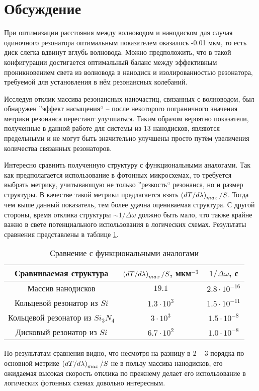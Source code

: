 \section{Обсуждение}

При оптимизации расстояния между волноводом и нанодиском для случая одиночного резонатора оптимальным показателем оказалось -0.01 мкм, то есть диск слегка вдвинут вглубь волновода. Можно предположить, что в такой конфигурации достигается оптимальный баланс между эффективным проникновением света из волновода в нанодиск и изолированностью резонатора, требуемой для установления в нём резонансных колебаний.

Исследуя отклик массива резонансных наночастиц, связанных с волноводом, был обнаружен ''эффект насыщения`` -- после некоторого пограничного значения метрики резонанса перестают улучшаться. Таким образом вероятно показатели, полученные в данной работе для системы из 13 нанодисков, являются предельными и не могут быть значительно улучшены просто путём увеличения количества связанных резонаторов.

Интересно сравнить полученную структуру с функциональными аналогами. Так как предполагается использование в фотонных микросхемах, то требуется выбрать метрику, учитывающую не только ''резкость`` резонанса, но и размер структуры. В качестве такой метрики предлагается взять $\left( dT/d\lambda \right)_{max}/S$. Тогда чем выше данный показатель, тем более удачна оцениваемая структура. С другой стороны, время отклика структуры $\sim 1/\Delta \omega$ должно быть мало, что также крайне важно в свете потенциального использования в логических схемах. Результаты сравнения представлены в таблице \ref{tbl:functional_compare}.

\begin{table}[H]
	\centering
	\begin{tabular}{|c|c|c|}
		\hline
		Сравниваемая структура & $\left( dT/d\lambda \right)_{max}/S$, мкм$^{-3}$ & $1/\Delta \omega$, с \\
		\hline
		Массив нанодисков & $19.1$ & $2.8 \cdot 10^{-16}$\\
		\hline
		Кольцевой резонатор из $Si$ \cite{Vilson2004} & $1.3 \cdot 10^3$ & $1.5 \cdot 10^{-11}$\\
		\hline
		Кольцевой резонатор из $Si_3 N_4$ \cite{Gondarenko2009} & $3 \cdot 10^3$ & $1.5 \cdot 10^{-8}$\\
		\hline
		Дисковый резонатор из $Si$ \cite{Soltani2007} & $6.7 \cdot 10^2$ & $1.0 \cdot 10^{-8}$\\
		\hline
	\end{tabular}
	\caption{Сравнение с функциональными аналогами}
	\label{tbl:functional_compare}
\end{table}

По результатам сравнения видно, что несмотря на разницу в 2 -- 3 порядка по основной метрике $\left( dT/d\lambda \right)_{max}/S$ не в пользу массива нанодисков, его ожидаемая высокая скорость отклика по прежнему делает его использование в логических фотонных схемах довольно интересным.